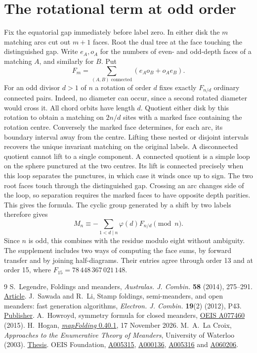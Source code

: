 \section{The rotational term at odd order}
Fix the equatorial gap immediately before label zero. In either disk the \(m\) matching arcs cut out \(m+1\) faces. Root the dual tree at the face touching the distinguished gap. Write \(e_A,o_A\) for the numbers of even- and odd-depth faces of a matching \(A\), and similarly for \(B\). Put
\[
  F_m=\sum_{(A,B)\text{ connected}}(e_Ao_B+o_Ae_B).
\]
For an odd divisor \(d>1\) of \(n\) a rotation of order \(d\) fixes exactly \(F_{n/d}\) ordinary connected pairs. Indeed, no diameter can occur, since a second rotated diameter would cross it. All chord orbits have length \(d\). Quotient either disk by this rotation to obtain a matching on \(2n/d\) sites with a marked face containing the rotation centre. Conversely the marked face determines, for each arc, its boundary interval away from the centre. Lifting these nested or disjoint intervals recovers the unique invariant matching on the original labels. A disconnected quotient cannot lift to a single component. A connected quotient is a simple loop on the sphere punctured at the two centres. Its lift is connected precisely when this loop separates the punctures, in which case it winds once up to sign. The two root faces touch through the distinguished gap. Crossing an arc changes side of the loop, so separation requires the marked faces to have opposite depth parities. This gives the formula. The cyclic group generated by a shift by two labels therefore gives
\[
 M_n\equiv-\sum_{1<d\mid n}\varphi(d)F_{n/d}\pmod n .
\]
Since \(n\) is odd, this combines with the residue modulo eight without ambiguity. The supplement includes two ways of computing the face sums, by forward transfer and by joining half-diagrams. Their entries agree through order 13 and at order 15, where \(F_{15}=78\,448\,367\,021\,148\).


\begin{thebibliography}{9}\small
{} S.~Legendre, Foldings and meanders, \emph{Australas. J. Combin.} \textbf{58} (2014), 275--291. \href{https://ajc.maths.uq.edu.au/pdf/58/ajc_v58_p275.pdf}{Article}.
 J.~Sawada and R.~Li, Stamp foldings, semi-meanders, and open meanders: fast generation algorithms, \emph{Electron. J. Combin.} \textbf{19}(2) (2012), P43. \href{https://doi.org/10.37236/2404}{Publisher}.
 A.~Howroyd, symmetry formula for closed meanders, \href{https://oeis.org/A077460}{OEIS A077460} (2015).
 H.~Hogan, \href{https://pypi.org/project/mapFolding/0.40.1/}{\emph{mapFolding} 0.40.1}, 17 November 2026.
 M.~A.~La Croix, \emph{Approaches to the Enumerative Theory of Meanders}, University of Waterloo (2003). \href{https://www.math.uwaterloo.ca/~malacroi/Latex/Meanders.pdf}{Thesis}.
 OEIS Foundation, \href{https://oeis.org/A005315}{A005315}, \href{https://oeis.org/A000136}{A000136}, \href{https://oeis.org/A005316}{A005316} and \href{https://oeis.org/A060206}{A060206}.
\end{thebibliography}


